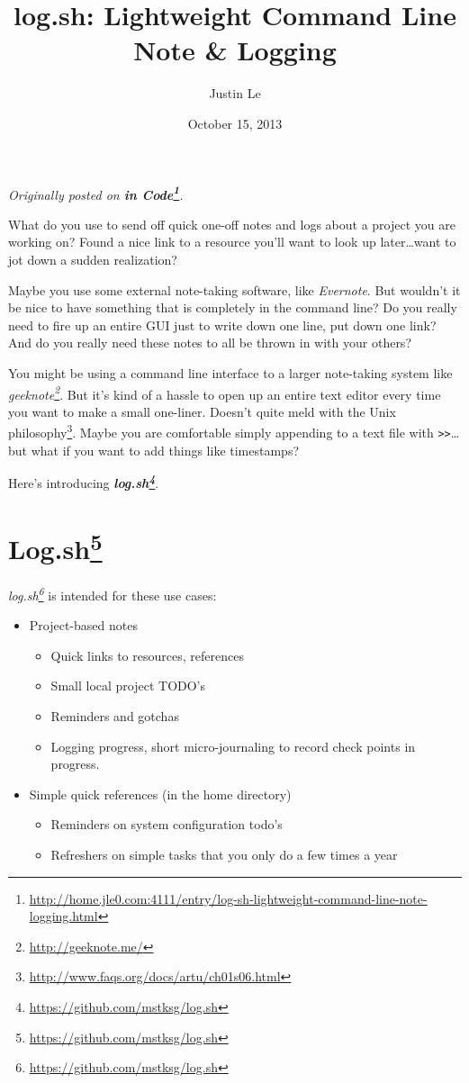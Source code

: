 \documentclass[]{article}
\title{log.sh: Lightweight Command Line Note \& Logging}
\author{Justin Le}
\date{October 15, 2013}
\renewcommand{\href}[2]{#2\footnote{\url{#1}}}
\begin{document}
\maketitle

\emph{Originally posted on
\textbf{\href{http://home.jle0.com:4111/entry/log-sh-lightweight-command-line-note-logging.html}{in
Code}}.}

What do you use to send off quick one-off notes and logs about a project you are working on? Found a
nice link to a resource you'll want to look up later\ldots{}want to jot down a sudden realization?

Maybe you use some external note-taking software, like \emph{Evernote}. But wouldn't it be nice to
have something that is completely in the command line? Do you really need to fire up an entire GUI
just to write down one line, put down one link? And do you really need these notes to all be thrown
in with your others?

You might be using a command line interface to a larger note-taking system like
\emph{\href{http://geeknote.me/}{geeknote}}. But it's kind of a hassle to open up an entire text
editor every time you want to make a small one-liner. Doesn't quite meld with the
\href{http://www.faqs.org/docs/artu/ch01s06.html}{Unix philosophy}. Maybe you are comfortable simply
appending to a text file with \texttt{\textgreater{}\textgreater{}}\ldots{}but what if you want to
add things like timestamps?

Here's introducing \textbf{\emph{\href{https://github.com/mstksg/log.sh}{log.sh}}}.

\section{\texorpdfstring{\href{https://github.com/mstksg/log.sh}{Log.sh}}{Log.sh}}\label{log.shlog.sh}

\emph{\href{https://github.com/mstksg/log.sh}{log.sh}} is intended for these use cases:

\begin{itemize}
\tightlist
\item
  Project-based notes

  \begin{itemize}
  \tightlist
  \item
    Quick links to resources, references
  \item
    Small local project TODO's
  \item
    Reminders and gotchas
  \item
    Logging progress, short micro-journaling to record check points in progress.
  \end{itemize}
\item
  Simple quick references (in the home directory)

  \begin{itemize}
  \tightlist
  \item
    Reminders on system configuration todo's
  \item
    Refreshers on simple tasks that you only do a few times a year
  \end{itemize}
\end{itemize}
\end{document}
